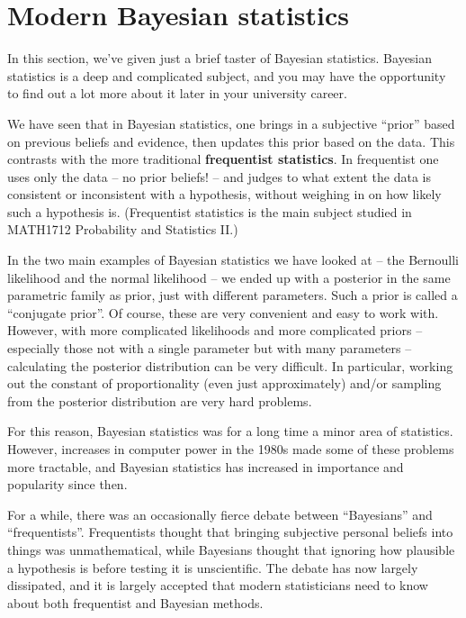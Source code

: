 \documentclass[
  letterpaper,
]{report}
\theoremstyle{definition}
\theoremstyle{definition}
\theoremstyle{remark}
\begin{document}
\hypertarget{modern-bayes}{%
\section{Modern Bayesian statistics}\label{modern-bayes}}

In this section, we've given just a brief taster of Bayesian statistics.
Bayesian statistics is a deep and complicated subject, and you may have
the opportunity to find out a lot more about it later in your university
career.

We have seen that in Bayesian statistics, one brings in a subjective
``prior'' based on previous beliefs and evidence, then updates this
prior based on the data. This contrasts with the more traditional
\textbf{frequentist statistics}. In frequentist one uses only the data
-- no prior beliefs! -- and judges to what extent the data is consistent
or inconsistent with a hypothesis, without weighing in on how likely
such a hypothesis is. (Frequentist statistics is the main subject
studied in MATH1712 Probability and Statistics II.)

In the two main examples of Bayesian statistics we have looked at -- the
Bernoulli likelihood and the normal likelihood -- we ended up with a
posterior in the same parametric family as prior, just with different
parameters. Such a prior is called a ``conjugate prior''. Of course,
these are very convenient and easy to work with. However, with more
complicated likelihoods and more complicated priors -- especially those
not with a single parameter but with many parameters -- calculating the
posterior distribution can be very difficult. In particular, working out
the constant of proportionality (even just approximately) and/or
sampling from the posterior distribution are very hard problems.

For this reason, Bayesian statistics was for a long time a minor area of
statistics. However, increases in computer power in the 1980s made some
of these problems more tractable, and Bayesian statistics has increased
in importance and popularity since then.

For a while, there was an occasionally fierce debate between
``Bayesians'' and ``frequentists''. Frequentists thought that bringing
subjective personal beliefs into things was unmathematical, while
Bayesians thought that ignoring how plausible a hypothesis is before
testing it is unscientific. The debate has now largely dissipated, and
it is largely accepted that modern statisticians need to know about both
frequentist and Bayesian methods.
\end{document}
